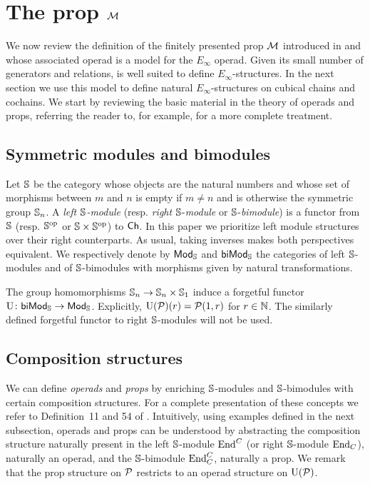 
\section{The prop \texorpdfstring{$\M$}{M}} \label{s:operads and props}

We now review the definition of the finitely presented prop $\M$ introduced in \cite{medina2020prop1} and whose associated operad is a model for the  $E_\infty$ operad.
Given its small number of generators and relations, is well suited to define $E_\infty$-structures.
In the next section we use this model to define natural $E_\infty$-structures on cubical chains and cochains.
We start by reviewing the basic material in the theory of operads and props, referring the reader to, for example, \cite{markl2008props} for a more complete treatment.

\subsection{Symmetric modules and bimodules}

Let $\S$ be the category whose objects are the natural numbers and whose set of morphisms between $m$ and $n$ is empty if $m \neq n$ and is otherwise the symmetric group $\S_n$.
A \textit{left $\S$-module} (resp. \textit{right} $\S$-\textit{module} or $\S$-\textit{bimodule}) is a functor from $\S$ (resp. $\S^\op$ or $\S \times \S^\op$) to $\Ch$.
In this paper we prioritize left module structures over their right counterparts.
As usual, taking inverses makes both perspectives equivalent.
We respectively denote by $\smod$ and $\sbimod$ the categories of left $\S$-modules and of $\S$-bimodules with morphisms given by natural transformations.

The group homomorphisms $\S_n \to \S_n \times \S_1$ induce a forgetful functor $\forget \colon \sbimod \to \smod$.
Explicitly, $\forget(\P)(r) = \P(1, r)$ for $r \in \N$.
The similarly defined forgetful functor to right $\S$-modules will not be used.

\subsection{Composition structures}

We can define \textit{operads} and \textit{props} by enriching $\S$-modules and $\S$-bimodules with certain composition structures.
For a complete presentation of these concepts we refer to Definition~11 and 54 of \cite{markl2008props}.
Intuitively, using examples defined in the next subsection, operads and props can be understood by abstracting the composition structure naturally present in the left $\S$-module $\End^C$ (or right $\S$-module $\End_C$), naturally an operad, and the $\S$-bimodule $\End^C_C$, naturally a prop.
We remark that the prop structure on $\P$ restricts to an operad structure on $\forget(\P)$.

